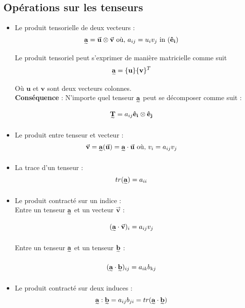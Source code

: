 \subsection{Opérations sur les tenseurs}
\begin{itemize}
    \item Le produit tensorielle de deux vecteurs : 
    \begin{equation*}
        \mathbf{\underset{\widetilde{}}{a}} = \vec{\mathbf{u}} \otimes \vec{\mathbf{v}} \text{ où, } a_{ij} = u_i v_j \text{ in } (\mathbf{\hat{e}_i})
    \end{equation*}
    Le produit tensoriel peut s'exprimer de manière matricielle comme suit 
    \begin{equation*}
        \mathbf{\underset{\widetilde{}}{a}} = \{\mathbf{u}\} \{\mathbf{v}\} ^T
    \end{equation*}
    Où $\mathbf{u}$ et $\mathbf{v}$ sont deux vecteurs colonnes.\\

    \textbf{Conséquence} : N'importe quel tenseur $\mathbf{\underset{\widetilde{}}{a}}$ peut se décomposer comme suit : 
    \begin{equation*}
    \mathbf{\underset{\widetilde{}}{T}} = a_{ij} \mathbf{\hat{e}_i} \otimes \mathbf{\hat{e}_j}
\end{equation*}

\item Le produit entre tenseur et vecteur : 
    \begin{equation*}
        \Vec{\mathbf{v}} = \mathbf{\underset{\widetilde{}}{a}}(\Vec{\mathbf{u}}) = \mathbf{\underset{\widetilde{}}{a}} \cdot \Vec{\mathbf{u}} \text{ où, } v_i = a_{ij} v_j
    \end{equation*}

\item La trace d'un tenseur : 
    \begin{equation*}
        tr(\mathbf{\underset{\widetilde{}}{a}}) = a_{ii}
    \end{equation*}

\item Le produit contracté sur un indice :\\

    Entre un tenseur $\mathbf{\underset{\widetilde{}}{a}}$ et un vecteur $\Vec{\mathbf{v}}$ :
    \begin{equation*}
        (\mathbf{\underset{\widetilde{}}{a}} \cdot \Vec{\mathbf{v}})_i = a_{ij}v_j
    \end{equation*}

    Entre un tenseur $\mathbf{\underset{\widetilde{}}{a}}$ et un tenseur $\mathbf{\underset{\widetilde{}}{b}}$ : 

    \begin{equation*}
        (\mathbf{\underset{\widetilde{}}{a}} \cdot \mathbf{\underset{\widetilde{}}{b}})_{ij} = a_{ik}b_{kj}
    \end{equation*}

\item Le produit contracté sur deux induces : 
    \begin{equation*}
        \mathbf{\underset{\widetilde{}}{a}} : \mathbf{\underset{\widetilde{}}{b}} = a_{ij}b_{ji} = tr(\mathbf{\underset{\widetilde{}}{a}} \cdot \mathbf{\underset{\widetilde{}}{b}})
    \end{equation*}
\end{itemize}



